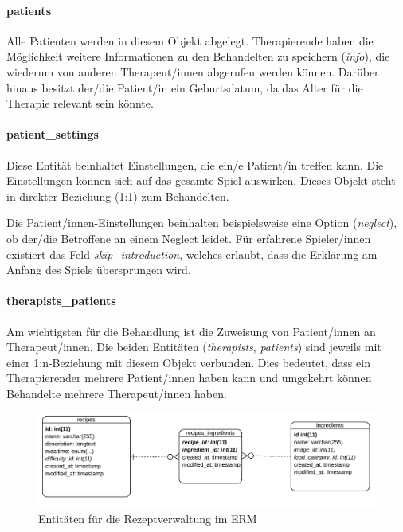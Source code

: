 \paragraph{patients}
Alle Patienten werden in diesem Objekt abgelegt. Therapierende haben die Möglichkeit weitere Informationen zu den Behandelten zu speichern (\textit{info}), die wiederum von anderen Therapeut/innen abgerufen werden können. Darüber hinaus besitzt der/die Patient/in ein Geburtsdatum, da das Alter für die Therapie relevant sein könnte.

\paragraph{patient\_settings}
Diese Entität beinhaltet Einstellungen, die ein/e Patient/in treffen kann. Die Einstellungen können sich auf das gesamte Spiel auswirken. Dieses Objekt steht in direkter Beziehung (1:1) zum Behandelten.

Die Patient/innen-Einstellungen beinhalten beispielsweise eine Option (\textit{neglect}), ob der/die Betroffene an einem Neglect leidet. Für erfahrene Spieler/innen existiert das Feld \textit{skip\_introduction}, welches erlaubt, dass die Erklärung am Anfang des Spiels übersprungen wird.

\paragraph{therapists\_patients}
Am wichtigsten für die Behandlung ist die Zuweisung von Patient/innen an Therapeut/innen. Die beiden Entitäten (\textit{therapists}, \textit{patients}) sind jeweils mit einer 1:n-Beziehung mit diesem Objekt verbunden. Dies bedeutet, dass ein Therapierender mehrere Patient/innen haben kann und umgekehrt können Behandelte mehrere Therapeut/innen haben.

\begin{figure}[H]
	\includegraphics[width=1\linewidth]{figures/development/planning/er/recipes.png}
	\caption{Entitäten für die Rezeptverwaltung im \acs{ERM}}
	\label{fig:er_recipes}
\end{figure}

